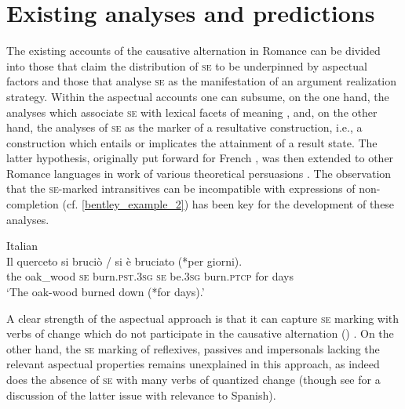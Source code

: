 \documentclass[output=paper,colorlinks,citecolor=brown
]{langscibook}
\begin{document}
\section{Existing analyses and predictions}
\label{bentley_section_2}
The existing accounts of the causative alternation in Romance can be divided into those that claim the distribution of \textsc{se} to be underpinned by aspectual factors and those that analyse \textsc{se} as the manifestation of an argument realization strategy. Within the aspectual accounts one can subsume, on the one hand, the analyses which associate \textsc{se} with lexical facets of meaning \citep{cennamo2012aspectual,cennamo2015valency,cennamo2021anticausatives,vivanco2021scalar}, and, on the other hand, the analyses of \textsc{se} as the marker of a resultative construction, i.e., a construction which entails or implicates the attainment of a result state. The latter hypothesis, originally put forward for French \citep{zribi1987reflexivite}, was then extended to other Romance languages in work of various theoretical persuasions \citep{jezek2003classi,folli2002constructing,folli2005consuming,manente2008laspect,labelle2010anticausative,cennamo2011anticausative,cennamo2012aspectual}. The observation that the \textsc{se}-marked intransitives can be incompatible with expressions of non-completion (cf. \ref{bentley_example_2}) has been key for the development of these analyses.

\ea Italian \citep[401]{cennamo2012aspectual} \label{bentley_example_2}\\
\gll
Il querceto si bruciò / si è bruciato {(*per giorni)}. \\
the	oak\_wood \textsc{se} burn.\textsc{pst}.3\textsc{sg} {} \textsc{se} be.3\textsc{sg} burn.\textsc{ptcp} {for days} {} \\
\glt `The oak-wood burned down (*for days).’ 
\z

A clear strength of the aspectual approach is that it can capture \textsc{se} marking with verbs of change which do not participate in the causative alternation () \citep{miguel2000operador,acedomatellan2022argument}. On the other hand, the \textsc{se} marking of reflexives, passives and impersonals lacking the relevant aspectual properties remains unexplained in this approach, as indeed does the absence of \textsc{se} with many verbs of quantized change (though see \cite{vivanco2021scalar} for a discussion of the latter issue with relevance to Spanish).
\end{document}

